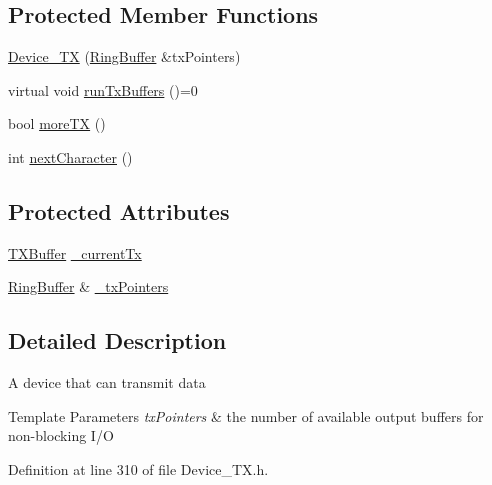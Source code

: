 \subsection*{Protected Member Functions}
\begin{DoxyCompactItemize}
\item 
\hyperlink{classmhvlib_1_1_device___t_x_a7c7d9c32d42a11da7ec616e11735bbfc}{Device\-\_\-\-T\-X} (\hyperlink{classmhvlib_1_1_ring_buffer}{Ring\-Buffer} \&tx\-Pointers)
\item 
virtual void \hyperlink{classmhvlib_1_1_device___t_x_aa9a0eb462357b51beb7072d8003b8959}{run\-Tx\-Buffers} ()=0
\item 
bool \hyperlink{classmhvlib_1_1_device___t_x_ae7f27f218fe5523e1a629eee53509b42}{more\-T\-X} ()
\item 
int \hyperlink{classmhvlib_1_1_device___t_x_a3b2da2bd1884de000aa2e4f6682fc2a1}{next\-Character} ()
\end{DoxyCompactItemize}
\subsection*{Protected Attributes}
\begin{DoxyCompactItemize}
\item 
\hyperlink{classmhvlib_1_1_t_x_buffer}{T\-X\-Buffer} \hyperlink{classmhvlib_1_1_device___t_x_af7907a7db6b5030f410eb71e6a57319a}{\-\_\-current\-Tx}
\item 
\hyperlink{classmhvlib_1_1_ring_buffer}{Ring\-Buffer} \& \hyperlink{classmhvlib_1_1_device___t_x_ad1a3f6fa7db2593694280e8dca963b33}{\-\_\-tx\-Pointers}
\end{DoxyCompactItemize}


\subsection{Detailed Description}
A device that can transmit data 
\begin{DoxyTemplParams}{Template Parameters}
{\em tx\-Pointers} & the number of available output buffers for non-\/blocking I/\-O \\
\hline
\end{DoxyTemplParams}


Definition at line 310 of file Device\-\_\-\-T\-X.\-h.



